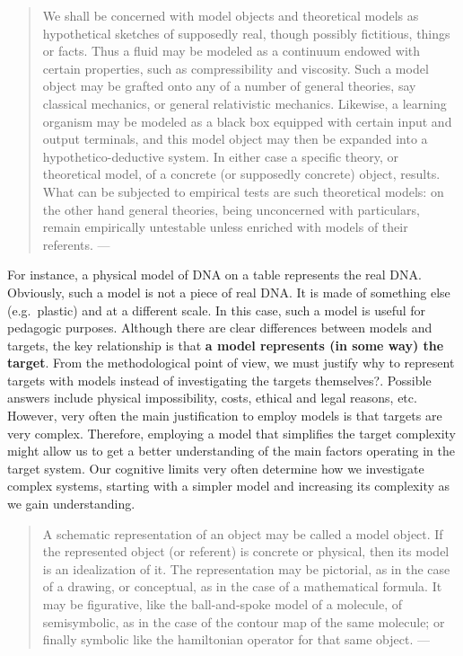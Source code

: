 \documentclass[
  12pt,
]{book}
\begin{document}
\begin{quote}
We shall be concerned with model objects and theoretical models as hypothetical sketches of supposedly real, though possibly fictitious, things or facts. Thus a fluid may be modeled as a continuum endowed with certain properties, such as compressibility and viscosity. Such a model object may be grafted onto any of a number of general theories, say classical mechanics, or general relativistic mechanics. Likewise, a learning organism may be modeled as a black box equipped with certain input and output terminals, and this model object may then be expanded into a hypothetico-deductive system. In either case a specific theory, or theoretical model, of a concrete (or supposedly concrete) object, results. What can be subjected to empirical tests are such theoretical models: on the other hand general theories, being unconcerned with particulars, remain empirically untestable unless enriched with models of their referents. --- \citep{bunge2012method}
\end{quote}

For instance, a physical model of DNA on a table represents the real DNA. Obviously, such a model is not a piece of real DNA. It is made of something else (e.g.~plastic) and at a different scale. In this case, such a model is useful for pedagogic purposes. Although there are clear differences between models and targets, the key relationship is that \textbf{a model represents (in some way) the target}. From the methodological point of view, we must justify why to represent targets with models instead of investigating the targets themselves?. Possible answers include physical impossibility, costs, ethical and legal reasons, etc. However, very often the main justification to employ models is that targets are very complex. Therefore, employing a model that simplifies the target complexity might allow us to get a better understanding of the main factors operating in the target system. Our cognitive limits very often determine how we investigate complex systems, starting with a simpler model and increasing its complexity as we gain understanding.

\begin{quote}
A schematic representation of an object may be called a model object. If the represented object (or referent) is concrete or physical, then its model is an idealization of it. The representation may be pictorial, as in the case of a drawing, or conceptual, as in the case of a mathematical formula. It may be figurative, like the ball-and-spoke model of a molecule, of semisymbolic, as in the case of the contour map of the same molecule; or finally symbolic like the hamiltonian operator for that same object. --- \citep{bunge2012method}
\end{quote}
\end{document}
